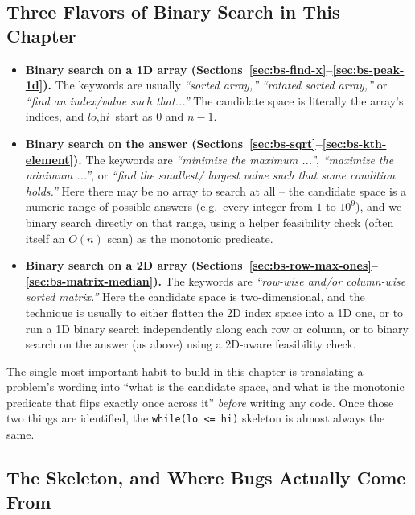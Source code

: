 \subsection*{Three Flavors of Binary Search in This Chapter}

\begin{patternbox}
\begin{itemize}
  \item \textbf{Binary search on a 1D array
        (Sections~\ref{sec:bs-find-x}--\ref{sec:bs-peak-1d}).} The keywords
        are usually \emph{``sorted array,''} \emph{``rotated sorted
        array,''} or \emph{``find an index/value such that...''} The
        candidate space is literally the array's indices, and $\textit{lo},
        \textit{hi}$ start as $0$ and $n-1$.
  \item \textbf{Binary search on the answer
        (Sections~\ref{sec:bs-sqrt}--\ref{sec:bs-kth-element}).} The
        keywords are \emph{``minimize the maximum ...''},
        \emph{``maximize the minimum ...''}, or \emph{``find the smallest/
        largest value such that some condition holds.''} Here there may be
        no array to search at all -- the candidate space is a numeric
        range of possible answers (e.g.\ every integer from $1$ to
        $10^9$), and we binary search directly on that range, using a
        helper feasibility check (often itself an $O(n)$ scan) as the
        monotonic predicate.
  \item \textbf{Binary search on a 2D array
        (Sections~\ref{sec:bs-row-max-ones}--\ref{sec:bs-matrix-median}).}
        The keywords are \emph{``row-wise and/or column-wise sorted
        matrix.''} Here the candidate space is two-dimensional, and the
        technique is usually to either flatten the 2D index space into a
        1D one, or to run a 1D binary search independently along each row
        or column, or to binary search on the answer (as above) using a
        2D-aware feasibility check.
\end{itemize}
The single most important habit to build in this chapter is translating a
problem's wording into ``what is the candidate space, and what is the
monotonic predicate that flips exactly once across it'' \emph{before}
writing any code. Once those two things are identified, the
\texttt{while(lo <= hi)} skeleton is almost always the same.
\end{patternbox}

\subsection*{The Skeleton, and Where Bugs Actually Come From}

